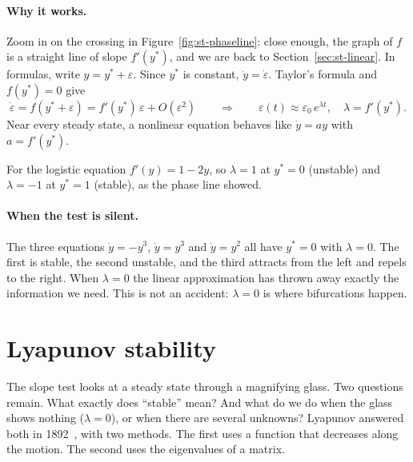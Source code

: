 \paragraph{Why it works.}
Zoom in on the crossing in Figure~\ref{fig:st-phaseline}: close enough, the
graph of $f$ is a straight line of slope $f'(y^*)$, and we are back to
Section~\ref{sec:st-linear}. In formulas, write $y = y^* + \varepsilon$. Since
$y^*$ is constant, $\dot y = \dot\varepsilon$. Taylor's formula and $f(y^*) = 0$ give
\begin{equation}\label{eq:st-linearization}
  \dot\varepsilon = f(y^* + \varepsilon)
  = f'(y^*)\,\varepsilon + O(\varepsilon^2)
  \qquad\Longrightarrow\qquad
  \varepsilon(t) \approx \varepsilon_0\,e^{\lambda t}, \quad \lambda = f'(y^*).
\end{equation}
Near every steady state, a nonlinear equation behaves like $\dot y = ay$ with
$a = f'(y^*)$.

For the logistic equation $f'(y) = 1 - 2y$, so $\lambda = 1$ at $y^* = 0$
(unstable) and $\lambda = -1$ at $y^* = 1$ (stable), as the phase line showed.

\paragraph{When the test is silent.}
The three equations $\dot y = -y^3$, $\dot y = y^3$ and $\dot y = y^2$ all have
$y^* = 0$ with $\lambda = 0$. The first is stable, the second unstable, and the
third attracts from the left and repels to the right. When $\lambda = 0$ the
linear approximation has thrown away exactly the information we need. This is
not an accident: $\lambda = 0$ is where bifurcations happen.

\section{Lyapunov stability}\label{sec:st-lyapunov}
%

The slope test looks at a steady state through a magnifying glass. Two questions
remain. What exactly does ``stable'' mean? And what do we do when the glass shows
nothing ($\lambda = 0$), or when there are several unknowns? Lyapunov answered both
in 1892~\cite{st-lyapunov1992}, with two methods. The first uses a function that
decreases along the motion. The second uses the eigenvalues of a matrix.


